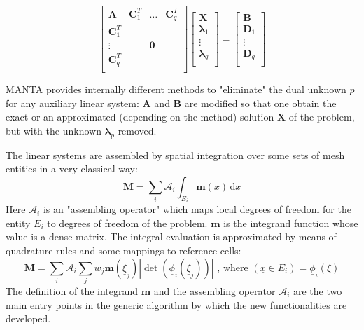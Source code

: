 {
\newcommand{\m}[1]{\boldsymbol{#1}}
\renewcommand{\v}[1]{\boldsymbol{#1}}
\renewcommand{\t}[1]{\underline{#1}}
\renewcommand{\d}[1]{\, \mathrm{d}#1}
\begin{equation}
   \begin{bmatrix}
     \m{A}&\m{C}^T_1&\hdots&\m{C}^T_q \\
     \m{C}^T_1&&& \\
     \vdots &&\m{0}& \\
     \m{C}^T_q &&&\\
   \end{bmatrix}
   \begin{bmatrix}
     \v{X} \\
     \v{\lambda}_1  \\
     \vdots\\
     \v{\lambda}_q \\
   \end{bmatrix}
   =
   \begin{bmatrix}
     \v{B} \\
     \v{D}_1  \\
     \vdots\\
     \v{D}_q \\
   \end{bmatrix}
\end{equation}


MANTA provides internally different methods to "eliminate" the dual unknown $p$ for any auxiliary linear system: $\m{A}$ and $\m{B}$ are modified so that one obtain the exact or an approximated (depending on the method) solution $\v{X}$ of the problem, but with the unknown $\v{\lambda}_p$ removed.

The linear systems are assembled by spatial integration over some sets of mesh entities in a very classical way:
\begin{equation}
  \m{M}=\sum_i \mathcal{A}_i \int_{E_i} \m{m}(\t{x}) \d{\t{x}}
\end{equation}
Here $\mathcal{A}_i$ is an "assembling operator" which maps local degrees of freedom for the entity $E_i$ to degrees of freedom of the problem. $\m{m}$ is the integrand function whose value is a dense matrix. The integral evaluation is approximated by means of quadrature rules and some mappings to reference cells:
\begin{equation}
  \m{M}=\sum_i \mathcal{A}_i \sum_{j} w_j \m{m}(\t{\xi}_j) |\det(\t{\phi}_i(\t{\xi}_j))| \text{ , where } (\t{x}\in E_i) = \t{\phi}_i(\xi)
\end{equation}
The definition of the integrand $\m{m}$ and the assembling operator $\mathcal{A}_i$ are the two main entry points in the generic algorithm by which the new functionalities are developed.

}

